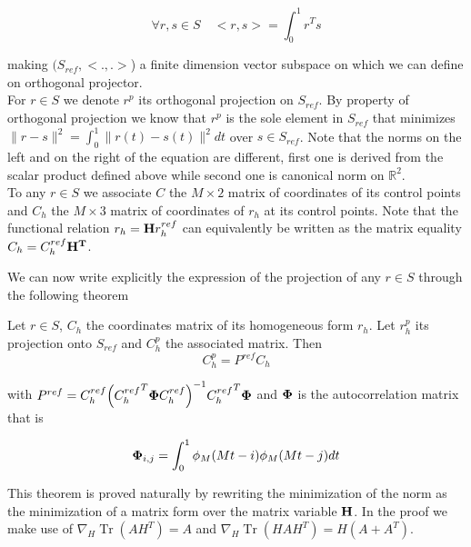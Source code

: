 \documentclass[a4paper, 11pt]{article}
\DeclareMathOperator*{\Tr}{Tr}
\begin{document}
\begin{equation*}
  \forall r, s \in S \quad <r, s> = \int_{0}^1 r^T s
\end{equation*}

making $(S_{ref}, <.,.>$) a finite dimension vector subspace on which we can define on orthogonal projector. \\ 

For $r \in S$ we denote $r^p$ its orthogonal projection on $S_{ref}$. By property of orthogonal projection we know that 
$r^p$ is the sole element in $S_{ref}$ that minimizes $\displaystyle \| r - s\|^2 = \int_{0}^1 \|r(t)-s(t)\|^2 dt$ over 
$s \in S_{ref}$.  Note that the norms on the left and on the right of the equation are different, first one is derived 
from the scalar product defined above while second one is canonical norm on $\mathbb{R}^2$. \\

To any $r \in S$ we associate $C$ the $M\times2$ matrix of coordinates of its control points and $C_h$ the $M\times3$ 
matrix of coordinates of $r_h$ at its control points. Note that the functional relation $r_h = {\bf H} r^{ref}_h$ can 
equivalently be written as the matrix equality $C_h = C^{ref}_h {\bf H^T}$.

We can now write explicitly the expression of the projection of any $r \in S$ through the following theorem

\begin{thm}{1}
  Let $r \in S$, $C_h$ the coordinates matrix of its homogeneous form $r_h$. Let $r^p_h$ its projection onto $S_{ref}$ 
  and $C^p_h$ the associated matrix. Then
    \begin{equation}
      C^p_h = P^{ref} C_h
    \end{equation}

    with $P^{ref} = C^{ref}_h{\left({C^{ref}_h}^T {\bf \Phi}C^{ref}_h\right)}^{-1} {C^{ref}_h}^T {\bf \Phi}$ and ${\bf
    \Phi}$ is the autocorrelation matrix that is 
    
    \begin{equation*}
      {\bf \Phi}_{i,j} = \int_0^1 \phi_M(Mt-i)\phi_M(Mt-j)dt
    \end{equation*}
\end{thm}

This theorem is proved naturally by rewriting the minimization of the norm as the minimization of a matrix form over the 
matrix variable ${\bf H}$. In the proof we make use of $\nabla_H \Tr(AH^T) = A$ and $\nabla_H \Tr(HAH^T) = H(A+A^T)$. 
 
\end{document}
